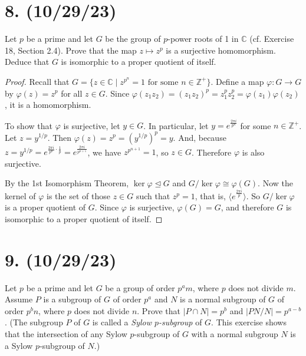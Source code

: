 \documentclass{article}
\begin{document}
\section*{8. (10/29/23)}

Let $p$ be a prime and let $G$ be the group of $p$-power roots of 1 in $\mathbb{C}$ (cf. Exercise 18, Section 2.4). Prove that the map $z \mapsto z^p$ is a surjective homomorphism. Deduce that $G$ is isomorphic to a proper quotient of itself.

\begin{proof}
    Recall that $G = \{ z \in \mathbb{C} \mid z^{p^n} = 1 \text{ for some } n \in \mathbb{Z}^+ \}$. Define a map $\varphi: G \rightarrow G$ by $\varphi(z) = z^p$ for all $z \in G$. Since $\varphi(z_1 z_2) = (z_1 z_2)^p = z_1^p z_2^p = \varphi(z_1) \varphi(z_2)$, it is a homomorphism.

    To show that $\varphi$ is surjective, let $y \in G$. In particular, let $y = e^{\frac{2 \pi i}{p^n}}$ for some $n \in \mathbb{Z}^+$. Let $z = y^{1/p}$. Then $\varphi(z) = z^p = (y^{1/p})^p = y$. And, because $z = y^{1/p} = e^{\frac{2 \pi i}{p^n} \cdot \frac{1}{p}} = e^{\frac{2 \pi i}{p^{n + 1}}}$, we have $z^{p^{n + 1}} = 1$, so $z \in G$. Therefore $\varphi$ is also surjective.

    By the 1st Isomorphism Theorem, $\ker \varphi \unlhd G$ and $G / \ker \varphi \cong \varphi(G)$. Now the kernel of $\varphi$ is the set of those $z \in G$ such that $z^p = 1$, that is, $\langle e^{\frac{2 \pi i}{p}} \rangle$. So $G / \ker \varphi$ is a proper quotient of $G$. Since $\varphi$ is surjective, $\varphi(G) = G$, and therefore $G$ is isomorphic to a proper quotient of itself.
\end{proof}

\section*{9. (10/29/23)}

Let $p$ be a prime and let $G$ be a group of order $p^a m$, where $p$ does not divide $m$. Assume $P$ is a subgroup of $G$ of order $p^a$ and $N$ is a normal subgroup of $G$ of order $p^b n$, where $p$ does not divide $n$. Prove that $|P \cap N| = p^b$ and $|PN / N| = p^{a - b}$. (The subgroup $P$ of $G$ is called a \emph{Sylow $p$-subgroup} of $G$. This exercise shows that the intersection of any Sylow $p$-subgroup of $G$ with a normal subgroup $N$ is a Sylow $p$-subgroup of $N$.)
\end{document}

